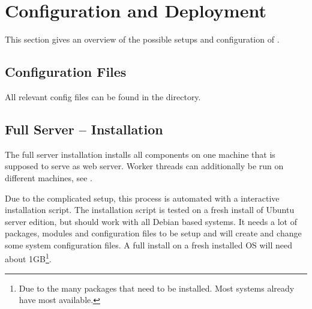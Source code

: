 \section{Configuration and Deployment}
\label{sec:deployment}

This section gives an overview of the possible setups and configuration of \spl.

\subsection{Configuration Files}

All relevant config files can be found in the  directory.

\begin{itemize}
\end{itemize}




\subsection{Full Server -- Installation}
\label{sec:serverinstall}

The full server installation installs all components on one machine that is supposed to serve as web server.
Worker threads can additionally be run on different machines, see .

Due to the complicated setup, this process is automated with a interactive installation script.
The installation script is tested on a fresh install of Ubuntu server edition, but should work with all Debian based systems.
It needs a lot of packages, modules and configuration files to be setup and will create and change some system configuration files.
A full install on a fresh installed OS will need about 1GB\footnote{Due to the many packages that need to be installed. Most systems already have most available.}.

